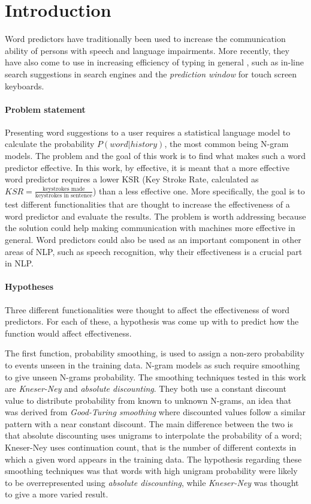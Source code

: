 \section{Introduction}
Word predictors have traditionally been used to increase the communication ability of persons with speech and language impairments\cite{Lesher99effectsof}\cite{keystrokes}\cite{corpus}. More recently, they have also come to use in increasing efficiency of typing in general \cite{Lesher99effectsof}, such as in-line search suggestions in search engines and the \emph{prediction window} for touch screen keyboards. 

\paragraph{Problem statement}
Presenting word suggestions to a user requires a statistical language model\cite{keystrokes} to calculate the probability $P(word|history)$, the most common being N-gram models\cite{Wandmacher}. The problem and the goal of this work is to find what makes such a word predictor effective. In this work, by effective, it is meant that a more effective word predictor requires a lower KSR (Key Stroke Rate, calculated as $KSR = \frac{\text{keystrokes made}}{\text{keystrokes in sentence}}$) than a less effective one. More specifically, the goal is to test different functionalities that are thought to increase the effectiveness of a word predictor and evaluate the results. The problem is worth addressing because the solution could help making communication with machines more effective in general. Word predictors could also be used as an important component in other areas of NLP, such as speech recognition, why their effectiveness is a crucial part in NLP.

\paragraph{Hypotheses}
Three different functionalities were thought to affect the effectiveness of word predictors. For each of these, a hypothesis was come up with to predict how the function would affect effectiveness.

The first function, probability smoothing, is used to assign a non-zero probability to events unseen in the training data\cite{smoothing}. N-gram models as such require smoothing to give unseen N-grams probability\cite{Russel}. The smoothing techniques tested in this work are \emph{Kneser-Ney} and \emph{absolute discounting}. They both use a constant discount value to distribute probability from known to unknown N-grams, an idea that was derived from \emph{Good-Turing smoothing} where discounted values follow a similar pattern with a near constant discount\cite{coursera}. The main difference between the two is that absolute discounting uses unigrams to interpolate the probability of a word; Kneser-Ney uses continuation count, that is the number of different contexts in which a given word appears in the training data\cite{coursera}. The hypothesis regarding these smoothing techniques was that words with high unigram probability were likely to be overrepresented using \emph{absolute discounting}, while \emph{Kneser-Ney} was thought to give a more varied result.

